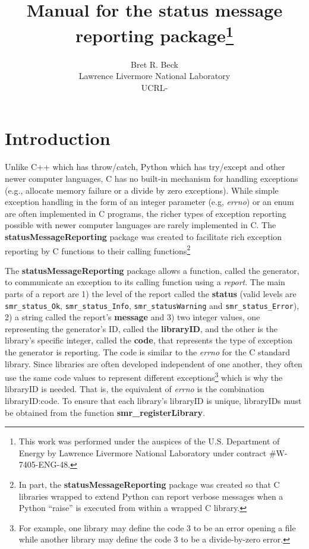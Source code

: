 \documentclass[11pt]{article}
\title{Manual for the status message reporting package\footnote{
This work was performed under the auspices of the U.S. Department of Energy by
Lawrence Livermore National Laboratory under contract \#W-7405-ENG-48.}}
\author{{Bret R. Beck}\\Lawrence Livermore National Laboratory\\UCRL-}
\begin{document}
\maketitle
\pagebreak
\tableofcontents
\listoftables
\pagebreak

\section{Introduction}
Unlike C++ which has throw/catch,
Python which has try/except and other newer computer languages, C has no built-in mechanism for handling exceptions
(e.g., allocate memory failure or a divide by zero exceptions). While simple exception handling in the form of an
integer parameter (e.g, \textit{errno}) or an enum are often implemented in C programs, the richer types of exception reporting
possible with newer computer languages are rarely implemented in C. The \textbf{statusMessageReporting} 
package was created to facilitate
rich exception reporting by C functions to their calling functions\footnote{In part, the \textbf{statusMessageReporting} package 
was created so that
C libraries wrapped to extend Python can report verbose messages when a Python ``raise'' is executed from within a
wrapped C library.}

The \textbf{statusMessageReporting} package allows a function, called the generator,
to communicate an exception to its calling function using a \textit{report}. 
The main parts of a report are 1) the level of the report called the \textbf{status} (valid levels are \texttt{smr\_status\_Ok}, 
\texttt{smr\_status\_Info}, \texttt{smr\_status\-Warning} and \texttt{smr\_status\_Error}), 
2) a string called the report's \textbf{message} and 3) two integer values, one representing the generator's ID, called the
\textbf{libraryID}, and the other is the library's specific integer, called the \textbf{code}, 
that represents the type of exception the generator is reporting.
The code is similar to the \textit{errno} for the C standard library.
Since libraries are often developed independent of one another, they often use the same code values to
represent different exceptions\footnote{For example, one library may define the code 3 to be an error opening a file while another library
may define the code 3 to be a divide-by-zero error.} which is why the libraryID is needed. That is,
the equivalent of \textit{errno} is the combination libraryID:code. 
To ensure that each library's libraryID is unique, libraryIDs
must be obtained from the function \textbf{smr\_registerLibrary}.
\end{document}
